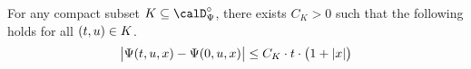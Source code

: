 \begin{proposition}
  \label{proposition:aff-differentiable}
  For any compact subset $K \subseteq \momentSpace^\circ$, there exists $C_K > 0$ such that the following holds for all $(t, u) \in K$.
  \begin{equation*}
    \big| \Psi(t, u, x) - \Psi(0, u, x) \big| \leq C_K \cdot t \cdot \big( 1 + |x| \big)
  \end{equation*}
\end{proposition}
